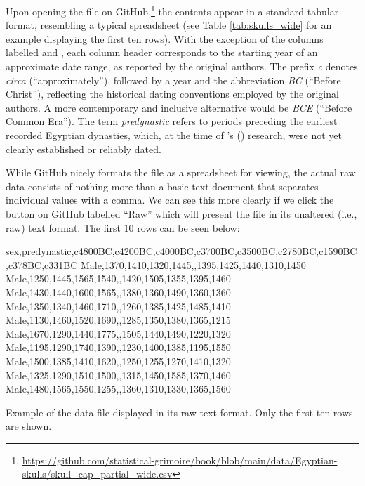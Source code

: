 Upon opening the file on GitHub,\footnote{\url{https://github.com/statistical-grimoire/book/blob/main/data/Egyptian-skulls/skull_cap_partial_wide.csv}} the contents appear in a standard tabular format, resembling a typical spreadsheet (see Table \ref{tab:skulls_wide} for an example displaying the first ten rows). With the exception of the columns labelled  and , each column header corresponds to the starting year of an approximate date range, as reported by the original authors. The prefix \textit{c} denotes \textit{circa} (``approximately''), followed by a year and the abbreviation \textit{BC} (``Before Christ''), reflecting the historical dating conventions employed by the original authors. A more contemporary and inclusive alternative would be \textit{BCE} (``Before Common Era''). The term \textit{predynastic} refers to periods preceding the earliest recorded Egyptian dynasties, which, at the time of \citeauthor{Thomson1905}'s (\citeyear{Thomson1905}) research, were not yet clearly established or reliably dated.

\vspace{1em}



While GitHub nicely formats the file as a spreadsheet for viewing, the actual raw data consists of nothing more than a basic text document that separates individual values with a comma. We can see this more clearly if we click the button on GitHub labelled ``Raw'' which will present the file in its unaltered (i.e., raw) text format. The first 10 rows can be seen below:

\vspace{1em}

\begin{listing}[H]
\begin{raw}
sex,predynastic,c4800BC,c4200BC,c4000BC,c3700BC,c3500BC,c2780BC,c1590BC,c378BC,c331BC
Male,1370,1410,1320,1445,,1395,1425,1440,1310,1450
Male,1250,1445,1565,1540,,1420,1505,1355,1395,1460
Male,1430,1440,1600,1565,,1380,1360,1490,1360,1360
Male,1350,1340,1460,1710,,1260,1385,1425,1485,1410
Male,1130,1460,1520,1690,,1285,1350,1380,1365,1215
Male,1670,1290,1440,1775,,1505,1440,1490,1220,1320
Male,1195,1290,1740,1390,,1230,1400,1385,1195,1550
Male,1500,1385,1410,1620,,1250,1255,1270,1410,1320
Male,1325,1290,1510,1500,,1315,1450,1585,1370,1460
Male,1480,1565,1550,1255,,1360,1310,1330,1365,1560
\end{raw}
\caption*{Example of the  data file displayed in its raw text format. Only the first ten rows are shown.}
\end{listing}


